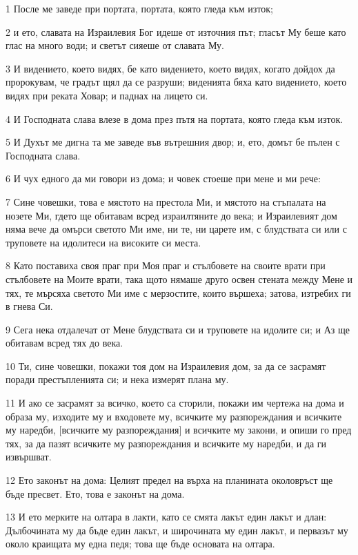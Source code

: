 \par 1 После ме заведе при портата, портата, която гледа към изток;
\par 2 и ето, славата на Израилевия Бог идеше от източния път; гласът Му беше като глас на много води; и светът сияеше от славата Му.
\par 3 И видението, което видях, бе като видението, което видях, когато дойдох да пророкувам, че градът щял да се разруши; виденията бяха като видението, което видях при реката Ховар; и паднах на лицето си.
\par 4 И Господната слава влезе в дома през пътя на портата, която гледа към изток.
\par 5 И Духът ме дигна та ме заведе във вътрешния двор; и, ето, домът бе пълен с Господната слава.
\par 6 И чух едного да ми говори из дома; и човек стоеше при мене и ми рече:
\par 7 Сине човешки, това е мястото на престола Ми, и мястото на стъпалата на нозете Ми, гдето ще обитавам всред израилтяните до века; и Израилевият дом няма вече да омърси светото Ми име, ни те, ни царете им, с блудствата си или с труповете на идолитеси на високите си места.
\par 8 Като поставиха своя праг при Моя праг и стълбовете на своите врати при стълбовете на Моите врати, така щото нямаше друго освен стената между Мене и тях, те мърсяха светото Ми име с мерзостите, които вършеха; затова, изтребих ги в гнева Си.
\par 9 Сега нека отдалечат от Мене блудствата си и труповете на идолите си; и Аз ще обитавам всред тях до века.
\par 10 Ти, сине човешки, покажи тоя дом на Израилевия дом, за да се засрамят поради престъпленията си; и нека измерят плана му.
\par 11 И ако се засрамят за всичко, което са сторили, покажи им чертежа на дома и образа му, изходите му и входовете му, всичките му разпореждания и всичките му наредби, [всичките му разпореждания] и всичките му закони, и опиши го пред тях, за да пазят всичките му разпореждания и всичките му наредби, и да ги извършват.
\par 12 Ето законът на дома: Целият предел на върха на планината околовръст ще бъде пресвет. Ето, това е законът на дома.
\par 13 И ето мерките на олтара в лакти, като се смята лакът един лакът и длан: Дълбочината му да бъде един лакът, и широчината му един лакът, и первазът му около краищата му една педя; това ще бъде основата на олтара.

